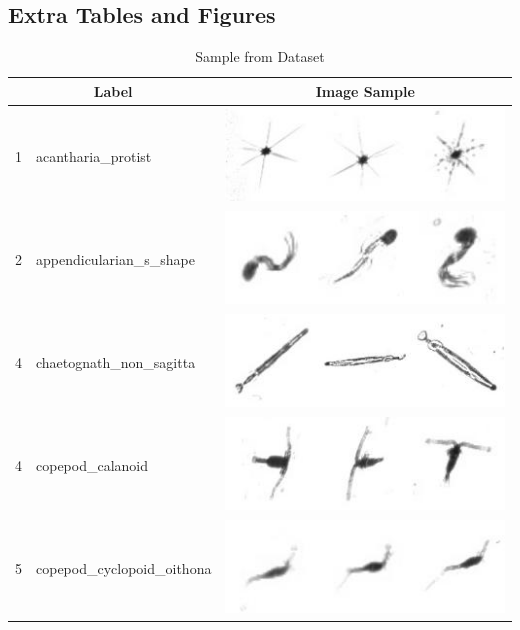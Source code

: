 \documentclass[11pt,oneside,a4paper]{article}
\numberwithin{equation}{section}
\begin{document}
\subsection*{Extra Tables and Figures}
\begin{table}[ht!]
\centering
\small
\caption{Sample from Dataset}
\begin{tabular}{m{3pt} m{130pt} m{120pt}}
\toprule
\multicolumn{2}{c}{Label} & \multicolumn{1}{c}{Image Sample}\\
\midrule
1 & acantharia\_protist & \includegraphics[scale=0.4]{./fig/acantharia_protist.png}\\
2 & appendicularian\_s\_shape & \includegraphics[scale=0.4]{./fig/appendicularian_s_shape.png}\\
4 & chaetognath\_non\_sagitta & \includegraphics[scale=0.4]{./fig/chaetognath_non_sagitta.png}\\
4 & copepod\_calanoid & \includegraphics[scale=0.4]{./fig/copepod_calanoid.png}\\
5 & copepod\_cyclopoid\_oithona & \includegraphics[scale=0.4]{./fig/copepod_cyclopoid_oithona.png}\\

\end{tabular}
\end{table}
\end{document}
